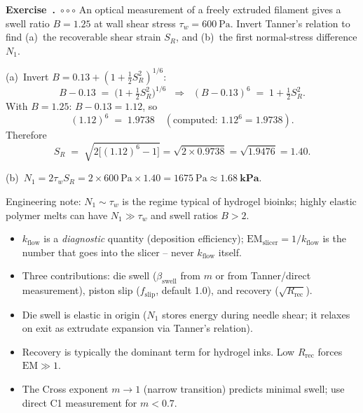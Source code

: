 \documentclass[11pt,a4paper]{article}
\newcommand{\diffC}{\textcolor{red!70!black}{$\circ\circ\circ$}}
\newcounter{exidx}[section]
\renewcommand{\theexidx}{\thesection.\arabic{exidx}}
\newenvironment{exercise}[1]%
  {\par\smallskip\refstepcounter{exidx}%
   \noindent\textbf{Exercise~\theexidx}~#1\quad}
  {\par\smallskip}
\begin{document}
\begin{exercise}{\diffC}
An optical measurement of a freely extruded filament gives a swell ratio
$B=1.25$ at wall shear stress $\tau_w=\SI{600}{\Pa}$. Invert Tanner's
relation to find (a)~the recoverable shear strain $S_R$, and (b)~the
first normal-stress difference $N_1$.
\end{exercise}
\begin{solution}
(a)~Invert $B=0.13+(1+\tfrac{1}{2}S_R^2)^{1/6}$:
\[
B-0.13 \;=\;\bigl(1+\tfrac{1}{2}S_R^2\bigr)^{1/6}
\;\;\Longrightarrow\;\;
(B-0.13)^{6} \;=\; 1+\tfrac{1}{2}S_R^{2}.
\]
With $B=1.25$: $B-0.13=1.12$, so
\[
(1.12)^{6} \;=\; 1.9738 \quad(\text{computed: }1.12^6=1.9738).
\]
Therefore
\[
S_R \;=\;\sqrt{2\bigl[(1.12)^{6}-1\bigr]}
     =\sqrt{2\times 0.9738}
     =\sqrt{1.9476}
     =\mathbf{1.40}.
\]

(b)~$N_1=2\tau_w S_R=2\times\SI{600}{\Pa}\times 1.40
=\SI{1675}{\Pa}\approx\mathbf{\SI{1.68}{\kPa}}$.

Engineering note: $N_1\sim\tau_w$ is the regime typical of
hydrogel bioinks; highly elastic polymer melts can have $N_1\gg\tau_w$
and swell ratios $B>2$.
\end{solution}

\begin{takeawaybox}
\begin{itemize}[leftmargin=1.4em,itemsep=2pt]
\item $k_\mathrm{flow}$ is a \emph{diagnostic} quantity (deposition
  efficiency); $\mathrm{EM}_\mathrm{slicer}=1/k_\mathrm{flow}$ is the
  number that goes into the slicer -- never $k_\mathrm{flow}$ itself.
\item Three contributions: die swell ($\beta_\mathrm{swell}$ from
  $m$ or from Tanner/direct measurement), piston slip ($f_\mathrm{slip}$,
  default 1.0), and recovery ($\sqrt{R_\mathrm{rec}}$).
\item Die swell is elastic in origin ($N_1$ stores energy during
  needle shear; it relaxes on exit as extrudate expansion via
  Tanner's relation).
\item Recovery is typically the dominant term for hydrogel inks. Low
  $R_\mathrm{rec}$ forces $\mathrm{EM}\gg 1$.
\item The Cross exponent $m\to 1$ (narrow transition) predicts
  minimal swell; use direct C1 measurement for $m<0.7$.
\end{itemize}
\end{takeawaybox}
\end{document}
